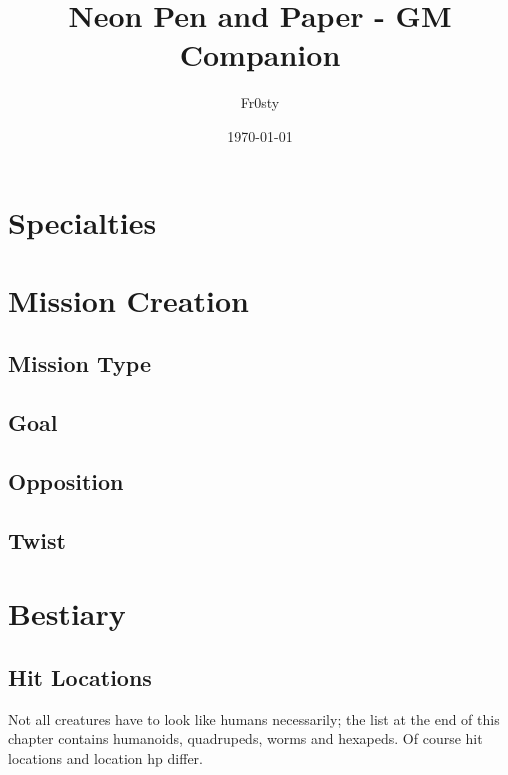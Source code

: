 \documentclass[12pt,a4paper,openany]{book}
\title{Neon Pen and Paper - GM Companion}
\author{Fr0sty}
\date{\today}
\begin{document}
	\maketitle
	\tableofcontents
	
	\chapter{Specialties}
	
	\chapter{Mission Creation}
	\section{Mission Type}
	\section{Goal}
	\section{Opposition}
	\section{Twist}
	
	\chapter{Bestiary}
	\section{Hit Locations}
	Not all creatures have to look like humans necessarily; the list at the end of this chapter contains humanoids, quadrupeds, worms and hexapeds. Of course hit locations and location hp differ.
	
\end{document}
